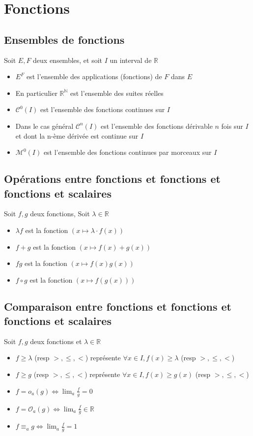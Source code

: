 \documentclass[11pt,colorlinks]{book}
\theoremstyle{mytheoremstyle}
\theoremstyle{mytheoremstyle}
\theoremstyle{mytheoremstyle}
\theoremstyle{mytheoremstyle}
\theoremstyle{mytheoremstyle}
\theoremstyle{mytheoremstyle}
\theoremstyle{mytheoremstyle}
\theoremstyle{mytheoremstyle}
\theoremstyle{myproblemstyle}
\def\mbb#1{\mathbb{#1}}
\def\bN{\mbb{N}}
\def\bR{\mbb{R}}
\def\mC{\mathcal{C}}
\def\mM{\mathcal{M}}
\def\rN{\bR^{\bN}}
\begin{document}
\section{Fonctions}
\subsection{Ensembles de fonctions}
\begin{rmq}
  Soit $E,F$ deux ensembles, et soit $I$ un interval de $\bR$
  \begin{itemize}
    \item $E^{F}$ est l'ensemble des applications (fonctions) de $F$ dans $E$
    \item En particulier $\rN$ est l'ensemble des suites réelles
    \item $\mC^0(I)$ est l'ensemble des fonctions continues sur $I$
    \item Dans le cas général $\mC^n(I)$ est l'ensemble des fonctions dérivable $n$ fois sur $I$ et 
    dont la n-ème dérivée est continue sur $I$
    \item $\mM^0(I)$ est l'ensemble des fonctions continues par morceaux sur $I$
  \end{itemize}
\end{rmq}
\subsection{Opérations entre fonctions et fonctions et fonctions et scalaires}
\begin{rmq}
  Soit $f,g$ deux fonctions, Soit $\lambda \in \bR$
  \begin{itemize}
    \item $\lambda f$ est la fonction $\left(x \mapsto \lambda \cdot f(x)\right)$
    \item $f+g$ est la fonction $\left(x \mapsto f(x)+g(x)\right)$
    \item $fg$ est la fonction $\left(x \mapsto f(x)g(x)\right)$
    \item $f \circ g$ est la fonction $\left(x \mapsto f(g(x))\right)$
  \end{itemize}
\end{rmq}
\subsection{Comparaison entre fonctions et fonctions et fonctions et scalaires}
\begin{rmq}
  Soit $f,g$ deux fonctions et $\lambda \in \bR$
  \begin{itemize}
  \item $f \geq \lambda$ (resp $>, \leq, <$) représente $\forall x \in I, f(x) \geq \lambda$ (resp $>,\leq,<$)
  \item $f \geq g$ (resp $>,\leq,<$) représente $\forall x \in I, f(x) \geq g(x)$ (resp $>,\leq,<$)
  \item $f = o_a(g) \Leftrightarrow \lim_a \frac{f}{g} = 0$
  \item $f = \mathcal{O}_a(g) \Leftrightarrow \lim_a \frac{f}{g} \in \bR$
  \item $f \equiv_a g \Leftrightarrow \lim_a \frac{f}{g} = 1$
  \end{itemize}
\end{rmq}
\end{document}
